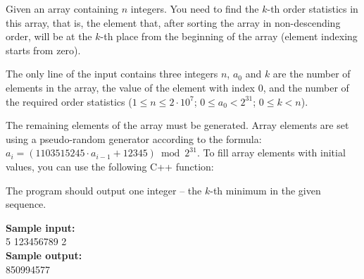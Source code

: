 \documentclass[a4paper]{article}
\begin{document}
Given an array containing $n$ integers. You need to find the $k$-th order statistics in this array, that is, the element that, after sorting the array in non-descending order, will be at the $k$-th place from the beginning of the array (element indexing starts from zero).

The only line of the input contains three integers $n$, $a_0$ and $k$ are the number of elements in the array, the value of the element with index $0$, and the number of the required order statistics ($1 \le n \le 2 \cdot 10^7$; $0 \le a_0 < 2^{31}$; $0 \le k < n$).

The remaining elements of the array must be generated. Array elements are set using a pseudo-random generator according to the formula: $a_i = (1103515245 \cdot a_{i-1} + 12345) \bmod 2^{31}$. To fill array elements with initial values, you can use the following C++ function:



\noindent The program should output one integer -- the $k$-th minimum in the given sequence.

\LINE

\noindent \textbf{Sample input:}\\
5 123456789 2\\


\noindent \textbf{Sample output:}\\
850994577
\end{document}
